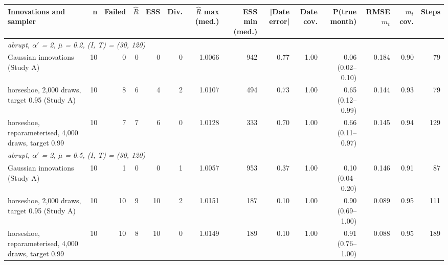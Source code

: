 \documentclass[10pt,a4paper]{article}
\begin{document}
\clearpage
\begin{landscape}
\noindent\begin{minipage}{\linewidth}
\label{tab:S11}
\centering\scriptsize
\begin{tabular}{lrrrrrrrrrrrrr}
\toprule
Innovations and sampler & n & Failed & $\hat{R}$ & ESS & Div. & $\hat{R}$ max (med.) & ESS min (med.) & |Date error| & Date cov. & P(true month) & RMSE $m_t$ & $m_t$ cov. & Steps \\ \midrule
\multicolumn{14}{l}{\itshape abrupt, $\alpha'$ = 2, $\bar{\mu}$ = 0.2, (I, T) = (30, 120)} \\
Gaussian innovations (Study A) & 10 & 0 & 0 & 0 & 0 & 1.0066 & 942 & 0.77 & 1.00 & 0.06 (0.02–0.10) & 0.184 & 0.90 & 79 \\
horseshoe, 2,000 draws, target 0.95 (Study A) & 10 & 8 & 6 & 4 & 2 & 1.0107 & 494 & 0.73 & 1.00 & 0.65 (0.12–0.99) & 0.144 & 0.93 & 79 \\
horseshoe, reparameterised, 4,000 draws, target 0.99 & 10 & 7 & 7 & 6 & 0 & 1.0128 & 333 & 0.70 & 1.00 & 0.66 (0.11–0.97) & 0.145 & 0.94 & 129 \\
\multicolumn{14}{l}{\itshape abrupt, $\alpha'$ = 2, $\bar{\mu}$ = 0.5, (I, T) = (30, 120)} \\
Gaussian innovations (Study A) & 10 & 1 & 0 & 0 & 1 & 1.0057 & 953 & 0.37 & 1.00 & 0.10 (0.04–0.20) & 0.146 & 0.91 & 87 \\
horseshoe, 2,000 draws, target 0.95 (Study A) & 10 & 10 & 9 & 10 & 2 & 1.0151 & 187 & 0.10 & 1.00 & 0.90 (0.69–1.00) & 0.089 & 0.95 & 111 \\
horseshoe, reparameterised, 4,000 draws, target 0.99 & 10 & 10 & 8 & 10 & 0 & 1.0149 & 189 & 0.10 & 1.00 & 0.91 (0.76–1.00) & 0.088 & 0.95 & 189 \\
\bottomrule
\end{tabular}
\end{minipage}
\vspace{22pt}
\end{landscape}
\end{document}
